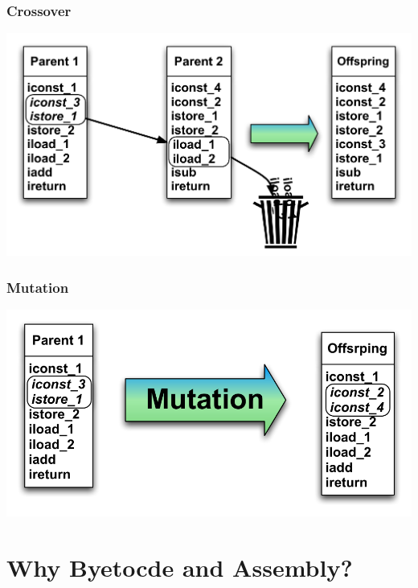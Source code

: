 \documentclass{beamer}
\begin{document}
\begin{frame}
	\frametitle{Crossover}

   \includegraphics[width=1\textwidth]{Illustrations/crossover.pdf}
       \\

\end{frame}

\begin{frame}
	\frametitle{Mutation}

   \includegraphics[width=1\textwidth]{Illustrations/mutation.pdf}
       \\

\end{frame}


\section[Why]{Why Byetocde and Assembly?}
\end{document}
